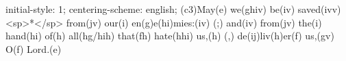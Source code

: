 initial-style: 1;
centering-scheme: english;
(c3)May(e) we(ghiv) be(iv) saved(ivv) <sp>*</sp> from(jv) our(i) en(g)e(hi)mies:(iv) (;) and(iv) from(jv) the(i) hand(hi) of(h) all(hg/hih) that(fh) hate(hhi) us,(h) (,) de(ij)liv(h)er(f) us,(gv) O(f) Lord.(e)
